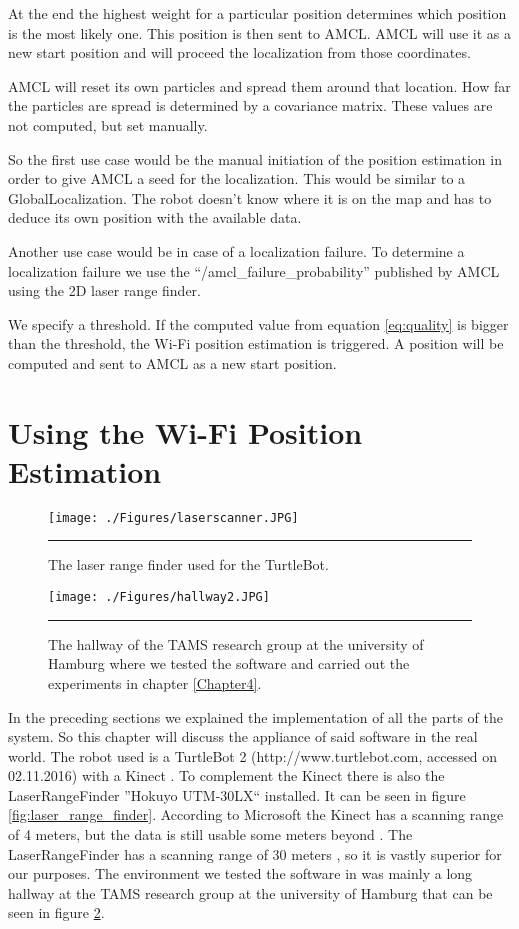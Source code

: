 At the end the highest weight for a particular position determines which position is the most likely one. This position is then sent to AMCL. AMCL will use it as a new start position and will proceed the localization from those coordinates. 

AMCL will reset its own particles and spread them around that location. How far the particles are spread is determined by a covariance matrix. These values are not computed, but set manually.

So the first use case would be the manual initiation of the position estimation in order to give AMCL a seed for the localization. This would be similar to a \gls{GlobalLocalization}. The robot doesn't know where it is on the map and has to deduce its own position with the available data. 

Another use case would be in case of a localization failure. To determine a localization failure we use the ``/amcl\_failure\_probability'' published by AMCL using the 2D laser range finder.

We specify a threshold. If the computed value from equation \ref{eq:quality} is bigger than the threshold, the Wi-Fi position estimation is triggered. A position will be computed and sent to AMCL as a new start position. 

\section{Using the Wi-Fi Position Estimation}
\begin{figure}[htbp]
	\centering
		\texttt{[image: ./Figures/laserscanner.JPG]}
		\rule{35em}{0.5pt}
	\caption[Laser Range Finder]{The laser range finder used for the TurtleBot.}
	\label{fig:laserrangefinder}
\end{figure}
\begin{figure}[htbp]
	\centering
		\texttt{[image: ./Figures/hallway2.JPG]}
		\rule{35em}{0.5pt}
	\caption[Hallway]{The hallway of the TAMS research group at the university of Hamburg where we tested the software and carried out the experiments in chapter \ref{Chapter4}.}
	\label{fig:hallway}
\end{figure}
In the preceding sections we explained the implementation of all the parts of the system. So this chapter will discuss the appliance of said software in the real world. The robot used is a TurtleBot 2 (http://www.turtlebot.com, accessed on 02.11.2016) with a Kinect \citep{ece21221}. To complement the Kinect there is also the \gls{LaserRangeFinder} ''Hokuyo UTM-30LX`` \citep{laser} installed. It can be seen in figure \ref{fig:laser_range_finder}. According to Microsoft the Kinect has a scanning range of 4 meters, but the data is still usable some meters beyond \citep{ece21221}. The \gls{LaserRangeFinder} has a scanning range of 30 meters \citep{laser}, so it is vastly superior for our purposes.  The environment we tested the software in was mainly a long hallway at the TAMS research group at the university of Hamburg that can be seen in figure \ref{fig:hallway}. 

